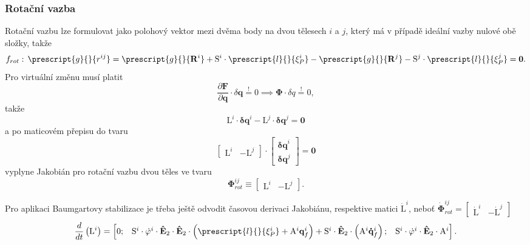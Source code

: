 \subsubsection{Rotační vazba}
Rotační vazbu lze formulovat jako polohový vektor mezi dvěma body na dvou tělesech $ i $ a $ j $, který má v případě ideální vazby nulové obě složky, takže
\begin{equation}\label{eq:MBS_rot vazba}
	f_{rot}: \,\prescript{g}{}{r^{ij}} = \prescript{g}{}{\mathbf{R}^i} + \mathrm{S}^{i}\cdot \prescript{l}{}{\mathbf{\xi}^i_P} - \prescript{g}{}{\mathbf{R}^j} - \mathrm{S}^{j}\cdot \prescript{l}{}{\mathbf{\xi}^j_P} = \mathbf{0}.
\end{equation}
Pro virtuální změnu musí platit
\begin{equation}
	\frac{\partial \mathbf{F}}{\partial \mathbf{q}} \cdot \delta \mathbf{q} \stackrel{!}{=} 0 \implies \mathbf{\Phi} \cdot \delta q \stackrel{!}{=} 0,
\end{equation}
takže 
\begin{equation}
	\mathrm{L}^i \cdot \mathbf{\delta{q}}^i - \mathrm{L}^j \cdot \mathbf{\delta{q}}^j = \mathbf{0}
\end{equation}
a po maticovém přepisu do tvaru
\begin{equation}
	\begin{bmatrix}
		\mathrm{L}^i & - \mathrm{L}^j
	\end{bmatrix} 
	\cdot
	\begin{bmatrix}
		\mathbf{\delta{q}}^i \\ 
		\mathbf{\delta{q}}^j
	\end{bmatrix} 
	= \mathbf{0}
\end{equation}
vyplyne Jakobián pro rotační vazbu dvou těles ve tvaru 
\begin{equation}\label{eq:MBS_Jac}
	\mathbf{\Phi}_{rot}^{ij} \equiv \begin{bmatrix}
		\mathrm{L}^i & - \mathrm{L}^j
	\end{bmatrix} .
\end{equation}

Pro aplikaci Baumgartovy stabilizace je třeba ještě odvodit časovou derivaci Jakobiánu, respektive matici $ \mathrm{\dot{L}}^i $, neboť $ \mathbf{\dot{\Phi}}_{rot}^{ij} = \begin{bmatrix}
	\mathrm{\dot{L}}^i & - \mathrm{\dot{L}}^j
\end{bmatrix} $
\begin{equation}\label{eq:}
	\frac{d}{dt}\left( \mathrm{L}^i\right)  = 
	\begin{bmatrix}
		0; & \mathrm{S}^{i} \cdot \dot{\varphi}^i \cdot  \mathbf{\hat{E}}_2 \cdot  \mathbf{\hat{E}}_2 \cdot \left( \prescript{l}{}{\mathbf{\xi}^i_P}+\mathrm{A}^i  \mathbf{q}_{f}^{i}\right) +\mathrm{S}^{i} \cdot  \mathbf{\hat{E}}_2 \cdot \left( \mathrm{A}^i \mathbf{\dot{q}}_{f}^{i}\right) ; & \mathrm{S}^{i} \cdot \dot{\varphi}^i \cdot  \mathbf{\hat{E}}_2 \cdot \mathrm{A}^i
	\end{bmatrix} .
\end{equation}

